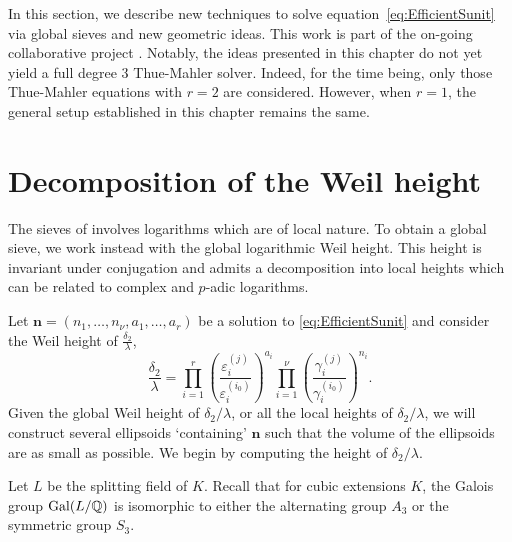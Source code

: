 In this section, we describe new techniques to solve equation~\eqref{eq:EfficientSunit} via global sieves and new geometric ideas. This work is part of the on-going collaborative project \cite{GhKaMaSi}. Notably, the ideas presented in this chapter do not yet yield a full degree $3$ Thue-Mahler solver. Indeed, for the time being, only those Thue-Mahler equations with $r = 2$ are considered. However, when $r = 1$, the general setup established in this chapter remains the same. 

\section{Decomposition of the Weil height} 

The sieves of \cite{TW3} involves logarithms which are of local nature. To obtain a global sieve, we work instead with the global logarithmic Weil height. This height is invariant under conjugation and admits a decomposition into local heights which can be related to complex and $p$-adic logarithms. 

Let $\mathbf{n} = (n_1, \dots, n_{\nu}, a_1, \dots, a_r)$ be a solution to \eqref{eq:EfficientSunit} and consider the Weil height of $\frac{\delta_2}{\lambda}$, 
\[\frac{\delta_2}{\lambda}= \prod_{i = 1}^{r}\left( \frac{\varepsilon_i^{(j)}}{\varepsilon_i^{(i_0)}}\right)^{a_i} \prod_{i = 1}^{\nu} \left( \frac{\gamma_i^{(j)}}{\gamma_i^{(i_0)}}\right)^{n_i}.\]
Given the global Weil height of $\delta_2/\lambda$, or all the local heights of $\delta_2/\lambda$, we will construct several ellipsoids `containing' $\mathbf{n}$ such that the volume of the ellipsoids are as small as possible. We begin by computing the height of $\delta_2/\lambda$. 

Let $L$ be the splitting field of $K$. Recall that for cubic extensions $K$, the Galois group $\operatorname{Gal}(L/\mathbb{Q})$ is isomorphic to either the alternating group $A_3$ or the symmetric group $S_3$. 

